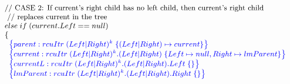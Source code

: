 \[\small
\begin{array}{@{}l@{}}
 \;\;\text{// CASE 2: If current's right child has no left child, then current's right child}\\
   \;\;\text{ //         replaces current in the tree}\\
   \;\; else\; if\; (current.Left == null)\\
    \;\;\{\\
        \;\;\;\;\specline{parent:rcuItr\; (Left|Right)^{k} \; \{(Left|Right)\mapsto current\} }\\
        \;\;\;\;\specline{current:rcuItr\; (Left|Right)^{k}.(Left|Right) \; \{ Left \mapsto null, Right \mapsto lmParent\} }\\
        \;\;\;\;\specline{currentL:rcuItr\; (Left|Right)^{k}.(Left|Right).Left \; \{\} }\\
        \;\;\;\;\specline{lmParent:rcuItr\; (Left|Right)^{k}.(Left|Right).Right \; \{ \} }\\
             

\end{array}\]
